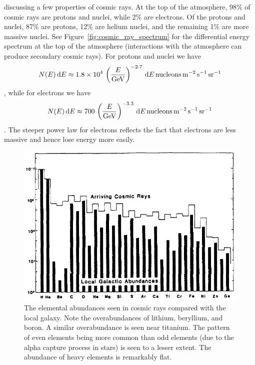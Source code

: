 \begin{enumerate}
       discussing a few properties of cosmic rays.  At the top of
      the atmosphere, 98\% of cosmic rays are protons and nuclei, while 2\% are electrons.
      Of the protons and nuclei, 87\% are protons, 12\% are helium nuclei, and the remaining
      1\% are more massive nuclei.
      See Figure~\ref{fig:cosmic_ray_spectrum} for the differential energy spectrum at the top of the
      atmosphere (interactions with the atmosphere can produce secondary cosmic rays).
      For protons and nuclei we have
      \begin{dmath}
        N(E)\,\d E \approx 1.8\times10^4\,\left(\frac{E}{\rm GeV}\right)^{-2.7}
                           \,\d E\,{\rm nucleons}\,{\rm m}^{-2}\,{\rm s}^{-1}\,{\rm sr}^{-1}
      \end{dmath},
      while for electrons we have
      \begin{dmath}
        N(E)\,\d E \approx 700\,\left(\frac{E}{\rm GeV}\right)^{-3.3}
                           \,\d E\,{\rm nucleons}\,{\rm m}^{-2}\,{\rm s}^{-1}\,{\rm sr}^{-1}
      \end{dmath}.
      The steeper power law for electrons reflects the fact that electrons are less massive
      and hence lose energy more easily.

      \begin{figure}[ht]
      \centering
      \includegraphics[width=\textwidth]{highenergy_cosmic_ray_abundances}
      \caption{The elemental abundances seen in cosmic rays compared with the local galaxy.
               Note the overabundances of lithium, beryllium, and boron.  A similar
               overabundance is seen near titanium.  The pattern of even elements being more
               common than odd elements (due to the alpha capture process in stars) is seen to
               a lesser extent.  The abundance of heavy elements is remarkably flat.}
      \label{fig:cosmic_ray_abundances}
      \end{figure}


\end{enumerate}
